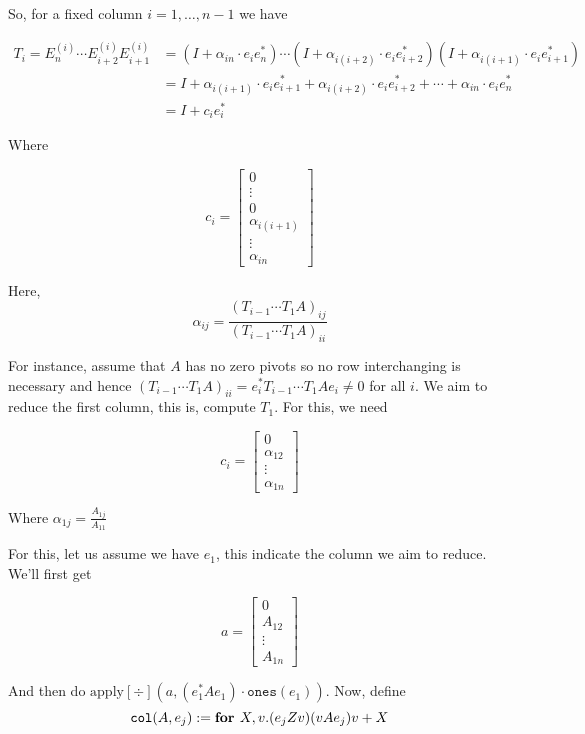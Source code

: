 So, for a fixed column $i=1, \ldots, n-1$ we have 

\begin{align*}
	T_i = E_{n}^{(i)} \cdots E_{i+2}^{(i)}E_{i+1}^{(i)}&=(I + \alpha_{in}\cdot e_ie_n^*)\cdots (I + \alpha_{i(i+2)}\cdot e_ie_{i+2}^*)(I + \alpha_{i(i+1)}\cdot e_ie_{i+1}^*) \\
	&=I + \alpha_{i(i+1)}\cdot e_ie_{i+1}^* + \alpha_{i(i+2)}\cdot e_ie_{i+2}^* + \cdots + \alpha_{in}\cdot e_ie_{n}^* \\
	&= I + c_ie_i^*
\end{align*}

Where

\[
c_i=
\begin{bmatrix}
    0 \\
    \vdots \\
    0 \\
    \alpha_{i(i+1)} \\
    \vdots \\
    \alpha_{in}
\end{bmatrix}
\]

Here, $$\alpha_{ij}=\frac{( T_{i-1}\cdots T_1A )_{ij}}{( T_{i-1}\cdots T_1A ) _{ii}}$$

For instance, assume that $A$ has no zero pivots so no row interchanging is necessary and hence $(T_{i-1}\cdots T_1A )_{ii}=e_i^*T_{i-1}\cdots T_1Ae_i\neq 0$ for all $i$. We aim to reduce the first column, this is, compute $T_1$. For this, we need 

\[
c_i=
\begin{bmatrix}
    0 \\
    \alpha_{12} \\
    \vdots \\
    \alpha_{1n}
\end{bmatrix}
\]

Where $\alpha_{1j}=\frac{A_{1j}}{A_{11}}$

For this, let us assume we have $e_1$, this indicate the column we aim to reduce. We'll first get 

\[
a = 
\begin{bmatrix}
    0 \\
    A_{12} \\
    \vdots \\
    A_{1n}
\end{bmatrix}
\]

And then do $\text{apply}[\div]\left( a, (e_1^*Ae_1)\cdot\texttt{ones}(e_1) \right)$. Now, define $$\texttt{col}(A,e_j):=\textbf{for } X,v. (e_jZv)(vAe_j)v + X$$

